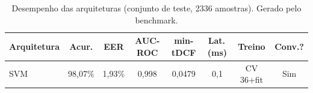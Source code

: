 \begin{table}[H]
\centering
\caption{Desempenho das arquiteturas (conjunto de teste, 2336 amostras). Gerado pelo benchmark.}
\label{tab:bench_resultados}
\small\singlespacing
\begin{tabular}{lccccccc}
\toprule
\textbf{Arquitetura} & \textbf{Acur.} & \textbf{EER} & \textbf{AUC-ROC} & \textbf{min-tDCF} & \textbf{Lat.\,(ms)} & \textbf{Treino} & \textbf{Conv.?} \\
\midrule
SVM & 98,07\% & 1,93\% & 0,998 & 0,0479 & 0,1 & CV 36+fit & \textcolor{successgreen}{Sim} \\
\bottomrule
\end{tabular}
\end{table}
